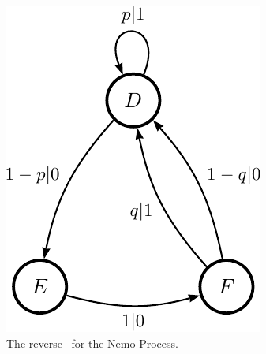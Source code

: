 \begin{figure}
\centering
\includegraphics{../chapter4/figures/nemo_reM_gr}
\caption{The reverse \eM\ for the Nemo Process.
  }
\label{fig:ReverseNemo}
\end{figure}

